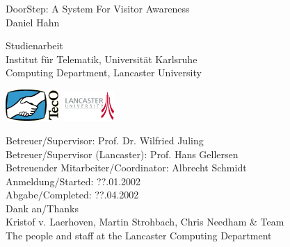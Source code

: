 \documentclass[a4paper]{danarticle}
\theoremstyle{remark}
\begin{document}
  \begin{titlepage}
    \raggedleft
    \vspace{2cm}
    \sffamily
    {\huge
    DoorStep: A System For Visitor Awareness\\
    }
    {\large
    Daniel Hahn\\
    }
    \vspace{2cm}
    \raggedright
    {\Large
    \hspace{2cm}Studienarbeit\\
    }
    {\large
    \hspace{2cm}Institut f\"ur Telematik, Universit\"at Karlsruhe\\
    \hspace{2cm}Computing Department, Lancaster University\\
    }
    \vspace{1cm}
    \begin{center}
      \includegraphics[width=2cm]{tecologo}
      \hspace{1cm}
      \includegraphics[width=2cm]{lancslogo}
    \end{center}
    \vspace{5cm}
    {\normalsize
    \hspace{2cm}Betreuer/Supervisor: Prof. Dr. Wilfried Juling \\
    \hspace{2cm}Betreuer/Supervisor (Lancaster): Prof. Hans Gellersen \\
    \vspace{5mm}
    \hspace{2cm}Betreuender Mitarbeiter/Coordinator: Albrecht Schmidt \\
    }
    \vspace{2cm}
    {\normalsize
    \hspace{2cm}Anmeldung/Started: ??.01.2002 \\
    \hspace{2cm}Abgabe/Completed: ??.04.2002 \\
    }
    \vspace{4cm}
    \centering
    {\small 
    Dank an/Thanks \\
    Kristof v. Laerhoven, Martin Strohbach, Chris Needham \& Team \\
    The people and staff at the Lancaster Computing Department \\
    }
  \end{titlepage}
\end{document}
